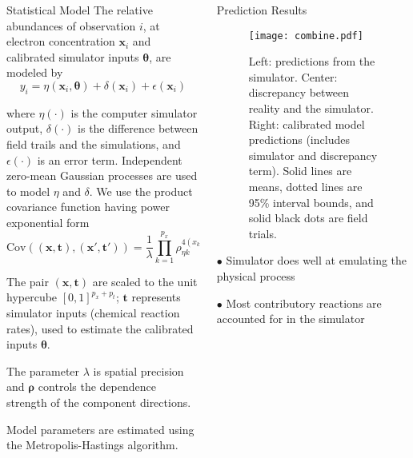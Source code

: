 \documentclass[final]{beamer}
\newcommand{\m}[1]{\mathbf{\bm{#1}}}
\begin{document}
\begin{frame}{}
\begin{columns}[t]
\begin{column}{.40\linewidth}
\begin{block}{Statistical Model}
    The relative abundances of observation $i$, at electron concentration $\m{x}_i$ and calibrated simulator inputs $\m{\theta}$, are modeled by
    \smallskip
    \[ y_i = \eta(\m{x}_i, \m{\theta}) + \delta(\m{x}_i) + \epsilon(\m{x}_i) \]
    \bigskip

    where $\eta(\cdot)$ is the computer simulator output, $\delta(\cdot)$ is the difference between field trails and the simulations, and $\epsilon(\cdot)$ is an error term. Independent zero-mean Gaussian processes are used to model $\eta$ and $\delta$. We use the product covariance function having power exponential form
    \bigskip
    \[ \mathrm{Cov}((\m{x},\m{t}),(\m{x}',\m{t}')) = \frac{1}{\lambda} \prod_{k=1}^{p_x} \rho_{\eta k} ^{4(x_k-x_k')^2}\times \prod_{k=1}^{p_t}(\rho_{\eta,p_x+k})^{4(t_k-t_k')^2} \]
    \bigskip

    The pair $(\m{x}, \m{t})$ are scaled to the unit hypercube $[0,1]^{p_x+p_t}$; $\m{t}$ represents simulator inputs (chemical reaction rates), used to estimate the calibrated inputs $\m{\theta}$.
    \bigskip
    \bigskip
    \bigskip
    \bigskip

    The parameter $\lambda$ is spatial precision and $\m{\rho}$ controls the dependence strength of the component directions.
    \bigskip
    \bigskip
    \bigskip
    \bigskip

    Model parameters are estimated using the Metropolis-Hastings algorithm.

    \end{block}
\end{column}

\begin{column}{.28\linewidth}
    \begin{block}{Prediction Results}

    \begin{figure}
        \centering
        \texttt{[image: combine.pdf]}
        \caption*{Left: predictions from the simulator. Center: discrepancy between reality and the simulator. Right: calibrated model predictions (includes simulator and discrepancy term). Solid lines are means, dotted lines are 95\% interval bounds, and solid black dots are field trials.}
    \end{figure}
    \bigskip
    \bigskip
    \bigskip
    \bigskip

    $\bullet$ Simulator does well at emulating the physical process

    $\bullet$ Most contributory reactions are accounted for in the simulator


\end{block}
\end{column}
\end{columns}
\end{frame}
\end{document}
